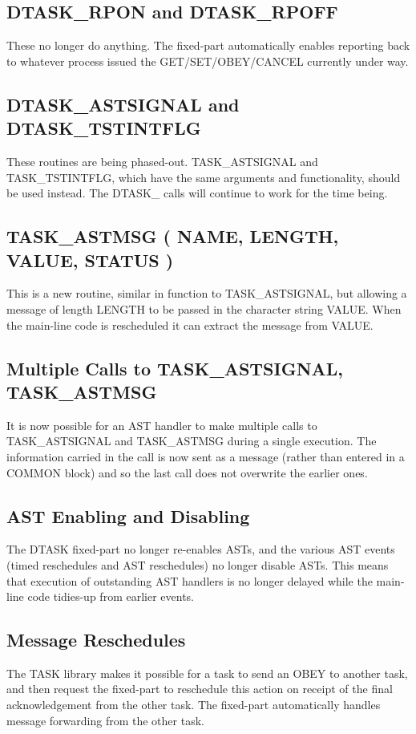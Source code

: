 \subsection{DTASK\_RPON and DTASK\_RPOFF}
These no longer do anything. The fixed-part automatically enables 
reporting back to whatever process issued the GET/SET/OBEY/CANCEL 
currently under way.

\subsection{DTASK\_ASTSIGNAL and DTASK\_TSTINTFLG}
These routines are being phased-out. TASK\_ASTSIGNAL 
and TASK\_TSTINTFLG, which have the same arguments and functionality, should
be used instead.
The DTASK\_ calls will continue to work for the time being.

\subsection{TASK\_ASTMSG ( NAME, LENGTH, VALUE, STATUS )}
This is a new routine, similar in function to TASK\_ASTSIGNAL, but 
allowing a message of length LENGTH to be passed in the character string 
VALUE. When the main-line code is rescheduled it can extract the message 
from VALUE.

\subsection{Multiple Calls to TASK\_ASTSIGNAL, TASK\_ASTMSG}
It is now possible for an AST handler to make 
multiple calls to TASK\_ASTSIGNAL and TASK\_ASTMSG during a single execution.
The information carried in the call is now sent as a message (rather than 
entered in a COMMON block) and so the last call does not overwrite the earlier
ones.

\subsection{AST Enabling and Disabling}
The DTASK fixed-part no longer re-enables ASTs, and the various AST 
events (timed reschedules and AST reschedules) no longer disable ASTs. 
This means that execution of outstanding AST handlers is no longer 
delayed while the main-line code tidies-up from earlier events.

\subsection{Message Reschedules}
The TASK library makes it possible for a task to send an OBEY to 
another task, and then request the fixed-part to reschedule this action 
on receipt of the final acknowledgement from the other task. The 
fixed-part automatically handles message forwarding from the other task.

